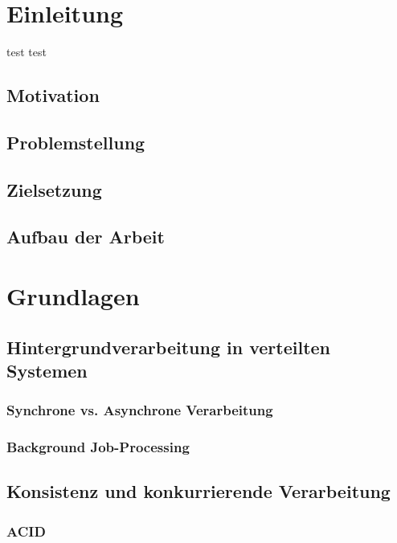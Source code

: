 \documentclass[11pt,a4paper]{scrreprt}
\begin{document}
\tableofcontents
\clearpage

\printglossary[type=\acronymtype,title=Abkürzungsverzeichnis]
\clearpage

\listoffigures
\clearpage


\setcounter{page}{1}

\chapter{Einleitung}

\gls{test}
    \gls*{test}
    \section{Motivation}
    \section{Problemstellung}
    \section{Zielsetzung}
    \section{Aufbau der Arbeit}

    \chapter{Grundlagen}
    \section{Hintergrundverarbeitung in verteilten Systemen}
    \subsection{Synchrone vs. Asynchrone Verarbeitung}
    \subsection{Background Job-Processing}

    \section{Konsistenz und konkurrierende Verarbeitung}
    \subsection{ACID}
\end{document}
